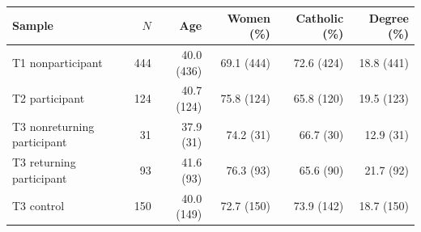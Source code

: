 
\begin{tabular}{lrrrrr}
\toprule
Sample & $N$ & Age & Women (\%) & Catholic (\%) & Degree (\%)\\
\midrule
T1 nonparticipant & 444 & 40.0 (436) & 69.1 (444) & 72.6 (424) & 18.8 (441)\\
T2 participant & 124 & 40.7 (124) & 75.8 (124) & 65.8 (120) & 19.5 (123)\\
T3 nonreturning participant & 31 & 37.9 (31) & 74.2 (31) & 66.7 (30) & 12.9 (31)\\
T3 returning participant & 93 & 41.6 (93) & 76.3 (93) & 65.6 (90) & 21.7 (92)\\
T3 control & 150 & 40.0 (149) & 72.7 (150) & 73.9 (142) & 18.7 (150)\\
\bottomrule
\end{tabular}
